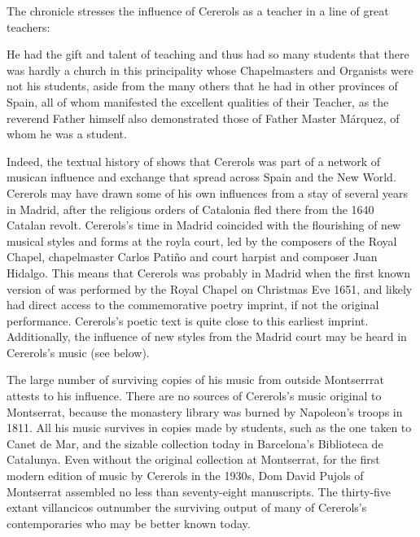 The chronicle stresses the influence of Cererols as a teacher in a line of great
teachers:
\begin{quoting}
    He had the gift and talent of teaching and thus had so many students that
    there was hardly a church in this principality  whose
    Chapelmasters and Organists were not his students, aside from the many
    others that he had in other provinces of Spain, all of whom manifested the
    excellent qualities of their Teacher, as the reverend Father himself also
    demonstrated those of Father Master Márquez, of whom he  was a
    student.
\end{quoting}
Indeed, the textual history of  shows that Cererols
was part of a network of musican influence and exchange that spread across Spain
and the New World. 
Cererols may have drawn some of his own influences from a stay of several years
in Madrid, after the religious orders of Catalonia fled there from the 1640
Catalan revolt.%
Cererols's time in Madrid coincided with the flourishing of new musical styles
and forms at the royla court, led by the composers of the Royal Chapel,
chapelmaster Carlos Patiño and court harpist and composer Juan Hidalgo.%
This means that Cererols was probably in Madrid when the first known version of
 was performed by the Royal Chapel on Christmas Eve
1651, and likely had direct access to the commemorative poetry imprint, if not
the original performance.
Cererols's poetic text is quite close to this earliest imprint.
Additionally, the influence of new styles from the Madrid court may be heard in
Cererols's music (see below).

The large number of surviving copies of his music from outside Montserrrat
attests to his influence.
There are no sources of Cererols's music original to Montserrat, because the
monastery library was burned by Napoleon's troops in 1811.%
All his music survives in copies made by students, such as the one taken to
Canet de Mar, and the sizable collection today in Barcelona's Biblioteca de
Catalunya.
Even without the original collection at Montserrat, for the first modern edition
of music by Cererols in the 1930s, Dom David Pujols of Montserrat assembled no
less than seventy-eight manuscripts.%
    \citXXX[MEM]
The thirty-five extant villancicos outnumber the surviving output of many of
Cererols's contemporaries who may be better known today.\XXX[who?]

